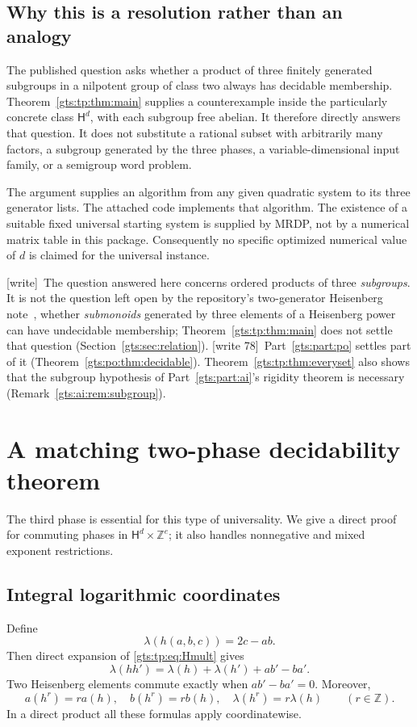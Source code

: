 \documentclass[11pt,letterpaper]{article}
\theoremstyle{definition}
\theoremstyle{remark}
\newcommand{\ZZ}{\mathbb Z}
\newcommand{\HH}{\mathsf H}
\newcommand{\wtag}{\textup{[write]}}
\newcommand{\wtagb}{\textup{[write 78]}}
\begin{document}
\subsection{Why this is a resolution rather than an analogy}
The published question asks whether a product of three finitely generated
subgroups in a nilpotent group of class two always has decidable membership.
Theorem~\ref{gts:tp:thm:main} supplies a counterexample inside the particularly
concrete class $\HH^d$, with each subgroup free abelian. It therefore directly
answers that question. It does not substitute a rational subset with
arbitrarily many factors, a subgroup generated by the three phases, a
variable-dimensional input family, or a semigroup word problem.

The argument supplies an algorithm from any given quadratic system to its
three generator lists. The attached code implements that algorithm. The
existence of a suitable fixed universal starting system is supplied by
MRDP, not by a numerical matrix table in this package. Consequently no
specific optimized numerical value of $d$ is claimed for the universal
instance.

\wtag\ The question answered here concerns ordered products of three \emph{subgroups}. It is not the question left open by the repository's two-generator Heisenberg note~\cite{repo-heis}, whether \emph{submonoids} generated by three elements of a Heisenberg power can have undecidable membership; Theorem~\ref{gts:tp:thm:main} does not settle that question (Section~\ref{gts:sec:relation}). \wtagb\ Part~\ref{gts:part:po} settles part of it (Theorem~\ref{gts:po:thm:decidable}). Theorem~\ref{gts:tp:thm:everyset} also shows that the subgroup hypothesis of Part~\ref{gts:part:ai}'s rigidity theorem is necessary (Remark~\ref{gts:ai:rem:subgroup}).

\section{A matching two-phase decidability theorem}
\label{gts:tp:sec:two}

The third phase is essential for this type of universality. We give a direct
proof for commuting phases in $\HH^d\times\ZZ^e$; it also handles
nonnegative and mixed exponent restrictions.

\subsection{Integral logarithmic coordinates}
Define
\[
                      \lambda(h(a,b,c))=2c-ab.
\]
Then direct expansion of \eqref{gts:tp:eq:Hmult} gives
\begin{equation}\label{gts:tp:eq:loglaw}
 \lambda(hh')=\lambda(h)+\lambda(h')+ab'-ba'.
\end{equation}
Two Heisenberg elements commute exactly when $ab'-ba'=0$. Moreover,
\begin{equation}\label{gts:tp:eq:logpower}
 a(h^r)=r a(h),\quad b(h^r)=r b(h),\quad
 \lambda(h^r)=r\lambda(h)\qquad(r\in\ZZ).
\end{equation}
In a direct product all these formulas apply coordinatewise.
\end{document}
